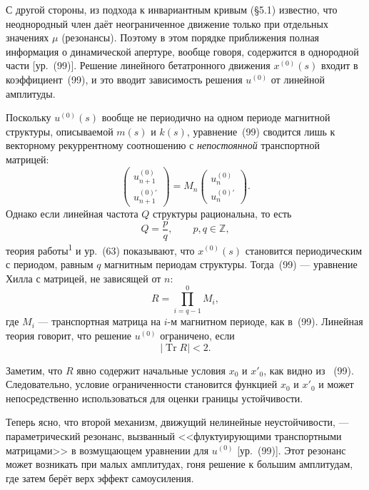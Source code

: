 \documentclass[11pt,a4paper]{article}
\DeclareMathOperator{\Tr}{Tr}
\begin{document}
С другой стороны, из подхода к инвариантным кривым (§5.1) известно, что
неоднородный член даёт неограниченное движение только при отдельных значениях
$\mu$ (резонансы). Поэтому в этом порядке приближения полная информация о
динамической апертуре, вообще говоря, содержится в однородной части [ур.~(99)].
Решение линейного бетатронного движения $x^{(0)}(s)$ входит в коэффициент~(99), и
это вводит зависимость решения $u^{(0)}$ от линейной амплитуды.

Поскольку $u^{(0)}(s)$ вообще не периодично на одном периоде магнитной структуры,
описываемой $m(s)$ и $k(s)$, уравнение~(99) сводится лишь к векторному
рекуррентному соотношению с \emph{непостоянной} транспортной матрицей:
\begin{equation}
\begin{pmatrix}u_{n+1}^{(0)}\\ u_{n+1}^{(0)\prime}\end{pmatrix}
=M_n
\begin{pmatrix}u_n^{(0)}\\ u_n^{(0)\prime}\end{pmatrix}.
\end{equation}
Однако если линейная частота $Q$ структуры рациональна, то есть
\begin{equation}
Q=\frac{p}{q},\qquad p,q\in\mathbb{Z},
\end{equation}
теория работы\textsuperscript{1} и ур.~(63) показывают, что $x^{(0)}(s)$
становится периодическим с периодом, равным $q$ магнитным периодам структуры.
Тогда~(99) --- уравнение Хилла с матрицей, не зависящей от $n$:
\begin{equation}
R=\prod_{i=q-1}^{0} M_i,
\end{equation}
где $M_i$ --- транспортная матрица на $i$-м магнитном периоде, как в~(99).
Линейная теория говорит, что решение $u^{(0)}$ ограничено, если
\begin{equation}
\bigl|\Tr R\bigr|<2.
\end{equation}

Заметим, что $R$ явно содержит начальные условия $x_0$ и $x'_0$, как видно из
~(99). Следовательно, условие ограниченности становится функцией $x_0$ и $x'_0$
и может непосредственно использоваться для оценки границы устойчивости.

Теперь ясно, что второй механизм, движущий нелинейные неустойчивости, ---
параметрический резонанс, вызванный <<флуктуирующими транспортными матрицами>> в
возмущающем уравнении для $u^{(0)}$ [ур.~(99)]. Этот резонанс может возникать при
малых амплитудах, гоня решение к большим амплитудам, где затем берёт верх эффект
самоусиления.
\end{document}
